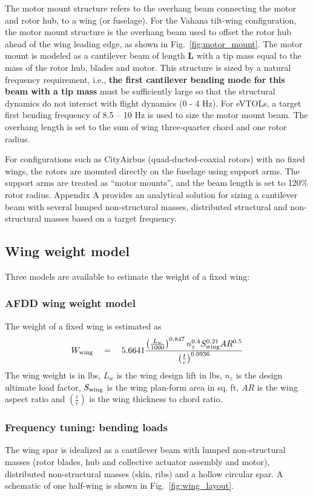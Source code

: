 The motor mount structure refers to the overhang beam connecting the motor and rotor hub, to a wing (or fuselage). For the Vahana tilt-wing configuration, the motor mount structure is the overhang beam used to offset the rotor hub ahead of the wing leading edge, as shown in Fig.~\ref{fig:motor_mount}. The motor mount is modeled as a cantilever beam of length \textbf{L} with a tip mass equal to the mass of the rotor hub, blades and motor. This structure is sized by a natural frequency requirement, i.e., \textbf{the first cantilever bending mode for this beam with a tip mass} must be sufficiently large so that the structural dynamics do not interact with flight dynamics (0 - 4 Hz). For eVTOLs, a target first bending frequency of 8.5 -- 10 Hz is used to size the motor mount beam. The overhang length is set to the sum of wing three-quarter chord and one rotor radius.

For configurations such as CityAirbus (quad-ducted-coaxial rotors) with no fixed wings, the rotors are mounted directly on the fuselage using support arms. The support arms are treated as ``motor mounts'', and the beam length is set to 120\% rotor radius. Appendix A provides an analytical solution for sizing a cantilever beam with several lumped non-structural masses, distributed structural and non-structural masses based on a target frequency. 

\subsection{Wing weight model}
Three models are available to estimate the weight of a fixed wing:

\subsubsection{AFDD wing weight model}
The weight of a fixed wing is estimated as 
\begin{equation*}
W_{\rm wing} \quad = \quad 5.6641 \frac{\left(\frac{L_w}{1000}\right)^{0.847} n_z^{0.4} S_{\rm wing}^{0.21} AR^{0.5}}{\left(\frac{t}{c}\right)^{0.0936}}
\end{equation*}
The wing weight is in lbs, $L_w$ is the wing design lift in lbs, $n_z$ is the design ultimate load factor, $S_{\rm wing}$ is the wing plan-form area in sq. ft, $AR$ is the wing aspect ratio and $\left(\frac{t}{c}\right)$ is the wing thickness to chord ratio. 

\subsubsection{Frequency tuning: bending loads}
The wing spar is idealized as a cantilever beam with lumped non-structural masses (rotor blades, hub and collective actuator assembly and motor), distributed non-structural masses (skin, ribs) and a hollow circular spar. A schematic of one half-wing is shown in Fig.~\ref{fig:wing_layout}. 

